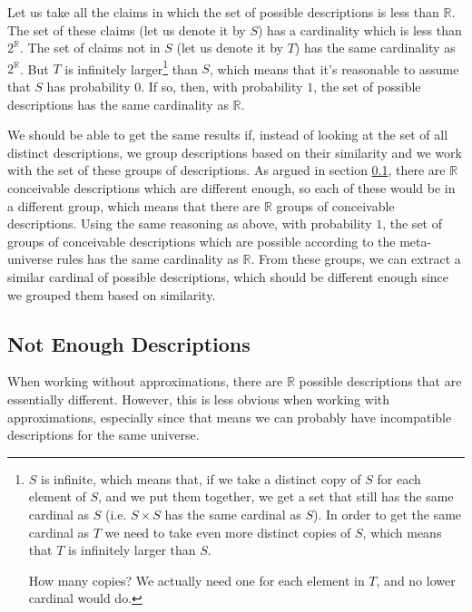 \documentclass[a4paper
,draft
]{article}
\def\reale{\mathbb{R}}
\begin{document}

Let us take all the claims in which the set of possible descriptions
is less than $\reale$.
The set of these claims (let us denote it by $S$)
has a cardinality which is less than $2^\reale$.
The set of claims not in $S$ (let us denote it by $T$) has the same cardinality
as $2^\reale$.
But $T$ is infinitely larger\footnote{
  $S$ is infinite, which means that, if we take a distinct copy of $S$ for each
  element of $S$, and we put them together, we get a set that still has the same
  cardinal as $S$ (i.e. $S\times S$ has the same cardinal as $S$). In order to
  get the same cardinal as $T$ we need to take even more distinct copies of $S$,
  which means that $T$ is infinitely larger than $S$.

  How many copies? We actually need one for each element in $T$, and no lower
  cardinal would do.
} than $S$, which means that it's reasonable to assume that $S$ has probability $0$.
If so, then, with probability $1$, the set of possible descriptions has the same
cardinality as $\reale$.

We should be able to get the same results if, instead of looking at the set
of all distinct descriptions, we group descriptions based on their similarity
and we work with the set of these groups of descriptions.
As argued in section \ref{sec:not-enough-descriptions},
there are $\reale$ conceivable descriptions which are different
enough, so each of these would be in a different group, which means that
there are $\reale$ groups of conceivable descriptions.
Using the same reasoning as above, with probability $1$, the set of groups of
conceivable descriptions which are possible according to the meta-universe
rules has the same cardinality as $\reale$.
From these groups, we can extract a similar cardinal of
possible descriptions, which should be different enough since we grouped them
based on similarity.

\subsection{Not Enough Descriptions}
\label{sec:not-enough-descriptions}

When working without approximations, there are $\reale$ possible descriptions
that are essentially different. However, this is less obvious when working with
approximations, especially since that means we can probably have incompatible
descriptions for the same universe.
\end{document}
